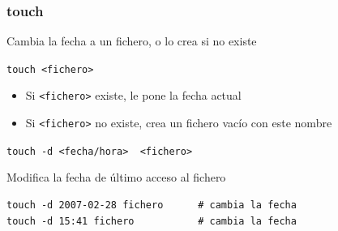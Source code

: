 \documentclass[ucs]{beamer}
\begin{document}
\begin{frame}[fragile]
\frametitle{touch}
Cambia la fecha a un fichero, o lo crea si no existe

\verb|touch <fichero>|
\begin{itemize}
\item
Si
\verb|<fichero>|
existe, le pone la fecha actual
\item
Si
\verb|<fichero>|
no existe, crea un fichero vacío con este nombre
\end{itemize}

\verb|touch -d <fecha/hora>  <fichero>|

Modifica la fecha de último acceso al fichero

  \begin{footnotesize}
  \begin{verbatim}
touch -d 2007-02-28 fichero      # cambia la fecha
touch -d 15:41 fichero           # cambia la fecha
  \end{verbatim}
  \end{footnotesize}


\end{frame}
\end{document}
